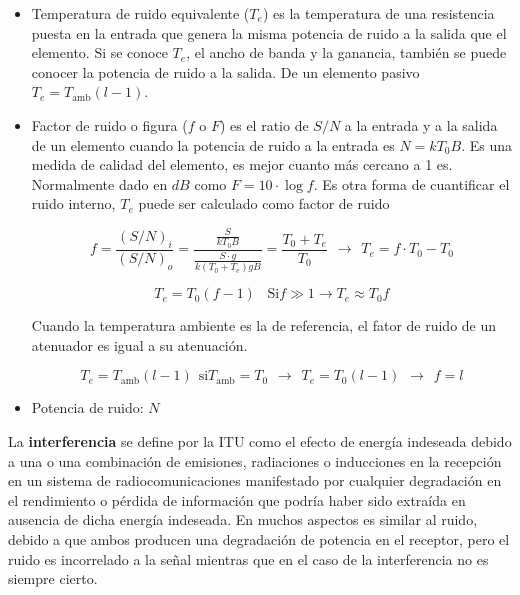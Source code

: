 \documentclass[10pt,portrait, twocolumn]{article}
\begin{document}
	\begin{itemize}
	\item Temperatura de ruido equivalente ($T_{e}$) es la temperatura de una resistencia puesta en la entrada que genera la misma potencia de ruido  a la salida que el elemento. Si se conoce $T_{e}$, el ancho de banda y la ganancia, también se puede conocer la potencia de ruido a la salida. De un elemento pasivo $T_{e} = T_{\text{amb}} (l -1)$.
	\item Factor de ruido o figura ($f$ o $F$) es el ratio de $S/N$ a la entrada y a la salida de un elemento cuando la potencia de ruido a la entrada es $N = k T_{0} B$. Es una medida de calidad del elemento, es mejor cuanto más cercano a 1 es. Normalmente dado en $dB$ como $F = 10 \cdot \log f$. Es otra forma de cuantificar el ruido interno, $T_{e}$ puede ser calculado como factor de ruido
	
		\begin{equation*}
		f = \frac{(S/N)_{i}}{(S/N)_{o}} = \frac{\frac{S}{k T_{0} B}}{\frac{S \cdot g}{k (T_{0} + T_{e}) g B}} = \frac{T_{0} + T_{e}}{T_{0}} \hspace{5pt} \rightarrow \hspace{5pt} T_{e} = f \cdot T_{0} - T_{0} 
		\end{equation*}
		
		\begin{equation*}
		T_{e} = T_{0} (f - 1) \hspace{10pt} \text{Si} f \gg 1 \rightarrow T_{e} \approx T_{0} f
		\end{equation*}
		
		Cuando  la temperatura ambiente es la de referencia, el fator de ruido de un atenuador es igual a su atenuación.
		
		\begin{equation*}
		T_{e} = T_{\text{amb}} (l - 1) \hspace{5pt} \text{si} T_{\text{amb}} = T_{0} \hspace{5pt} \rightarrow \hspace{5pt} T_{e} = T_{0} (l - 1) \hspace{5pt} \rightarrow \hspace{5pt} f = l
		\end{equation*}
		
	\item Potencia de ruido: $N$
	\end{itemize}
	
La \textbf{interferencia} se define por la ITU como el efecto de energía indeseada debido a una o una combinación de emisiones, radiaciones o inducciones en la recepción en un sistema de radiocomunicaciones manifestado por cualquier degradación en el rendimiento o pérdida de información que podría haber sido extraída en ausencia de dicha energía indeseada. En muchos aspectos es similar al ruido, debido a que ambos producen una degradación de potencia en el receptor, pero el ruido es incorrelado a la señal mientras que en el caso de la interferencia no es siempre cierto. 
\end{document}
